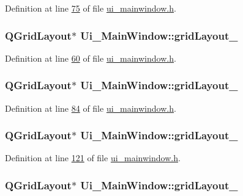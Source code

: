 Definition at line \hyperlink{a00052_source_l00075}{75} of file \hyperlink{a00052_source}{ui\+\_\+mainwindow.\+h}.

\hypertarget{a00027_a8ee86315639f324b17708efc7dbe8b19}{
\subsubsection[{grid\+Layout\+\_\+4}]{\setlength{\rightskip}{0pt plus 5cm}Q\+Grid\+Layout$\ast$ Ui\+\_\+\+Main\+Window\+::grid\+Layout\+\_}}\label{a00027_a8ee86315639f324b17708efc7dbe8b19}


Definition at line \hyperlink{a00052_source_l00060}{60} of file \hyperlink{a00052_source}{ui\+\_\+mainwindow.\+h}.

\hypertarget{a00027_a8731b71c513ff94baf59614807823c5d}{
\subsubsection[{grid\+Layout\+\_\+5}]{\setlength{\rightskip}{0pt plus 5cm}Q\+Grid\+Layout$\ast$ Ui\+\_\+\+Main\+Window\+::grid\+Layout\+\_}}\label{a00027_a8731b71c513ff94baf59614807823c5d}


Definition at line \hyperlink{a00052_source_l00084}{84} of file \hyperlink{a00052_source}{ui\+\_\+mainwindow.\+h}.

\hypertarget{a00027_ad113cf7b76aaf178473555bdf64ff035}{
\subsubsection[{grid\+Layout\+\_\+6}]{\setlength{\rightskip}{0pt plus 5cm}Q\+Grid\+Layout$\ast$ Ui\+\_\+\+Main\+Window\+::grid\+Layout\+\_}}\label{a00027_ad113cf7b76aaf178473555bdf64ff035}


Definition at line \hyperlink{a00052_source_l00121}{121} of file \hyperlink{a00052_source}{ui\+\_\+mainwindow.\+h}.

\hypertarget{a00027_a4c2d544352d423a361b8ab2e1d5636ec}{
\subsubsection[{grid\+Layout\+\_\+7}]{\setlength{\rightskip}{0pt plus 5cm}Q\+Grid\+Layout$\ast$ Ui\+\_\+\+Main\+Window\+::grid\+Layout\+\_}}\label{a00027_a4c2d544352d423a361b8ab2e1d5636ec}


